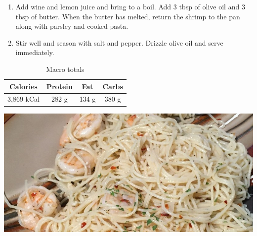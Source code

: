 \documentclass{report}
\begin{document}
\begin{multicols}{2}
\begin{enumerate}
\item Add wine and lemon juice and bring to a boil. Add 3 tbsp of olive oil and 3 tbsp of butter. When the butter has melted, return the shrimp to the pan along with parsley and cooked pasta. 
\newline 

 \item Stir well and season with salt and pepper. Drizzle olive oil and serve immediately.   
\end{enumerate}
\begin{table}[H]
  \begin{center}
    \caption{Macro totals}
    \label{tab:table1}
    \begin{tabular}{c|c|c|c} %
      \textbf{Calories} & \textbf{Protein} & \textbf{Fat} & \textbf{Carbs}\\
      \hline
      3,869 kCal & 282 g & 134 g & 380 g\\
    \end{tabular}
  \end{center}
\end{table}
\end{multicols}



\begin{center}
\includegraphics[scale=0.65]{Pasta/Shrimp Scampi/Shrimp Scampi.jpg}
\end{center}
\end{document}
